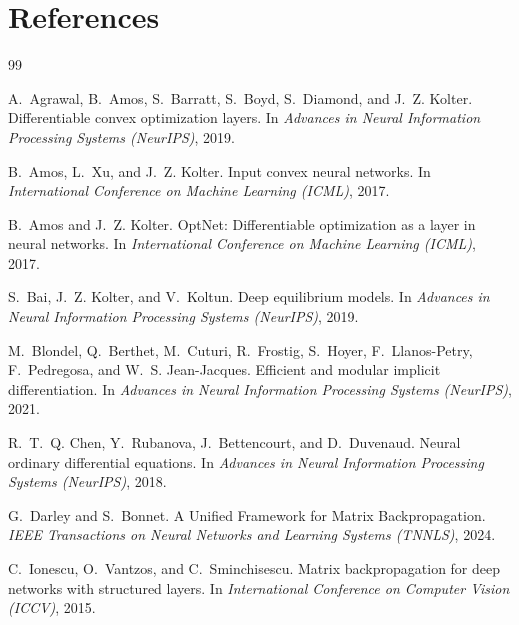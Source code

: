 \documentclass{article}
\begin{document}
\section*{References}
\small
\begin{thebibliography}{99}

  A.~Agrawal, B.~Amos, S.~Barratt, S.~Boyd, S.~Diamond, and J.~Z. Kolter.
  \newblock Differentiable convex optimization layers.
  \newblock In \textit{Advances in Neural Information Processing Systems (NeurIPS)}, 2019.

  B.~Amos, L.~Xu, and J.~Z. Kolter.
  \newblock Input convex neural networks.
  \newblock In \textit{International Conference on Machine Learning (ICML)}, 2017.

  B.~Amos and J.~Z. Kolter.
  \newblock OptNet: Differentiable optimization as a layer in neural networks.
  \newblock In \textit{International Conference on Machine Learning (ICML)}, 2017.

  S.~Bai, J.~Z. Kolter, and V.~Koltun.
  \newblock Deep equilibrium models.
  \newblock In \textit{Advances in Neural Information Processing Systems (NeurIPS)}, 2019.

  M.~Blondel, Q.~Berthet, M.~Cuturi, R.~Frostig, S.~Hoyer, F.~Llanos-Petry, F.~Pedregosa, and W.~S. Jean-Jacques.
  \newblock Efficient and modular implicit differentiation.
  \newblock In \textit{Advances in Neural Information Processing Systems (NeurIPS)}, 2021.

  R.~T.~Q. Chen, Y.~Rubanova, J.~Bettencourt, and D.~Duvenaud.
  \newblock Neural ordinary differential equations.
  \newblock In \textit{Advances in Neural Information Processing Systems (NeurIPS)}, 2018.

  G.~Darley and S.~Bonnet.
  \newblock A Unified Framework for Matrix Backpropagation.
  \newblock \textit{IEEE Transactions on Neural Networks and Learning Systems (TNNLS)}, 2024.

  C.~Ionescu, O.~Vantzos, and C.~Sminchisescu.
  \newblock Matrix backpropagation for deep networks with structured layers.
  \newblock In \textit{International Conference on Computer Vision (ICCV)}, 2015.

\end{thebibliography}

\clearpage
\end{document}

